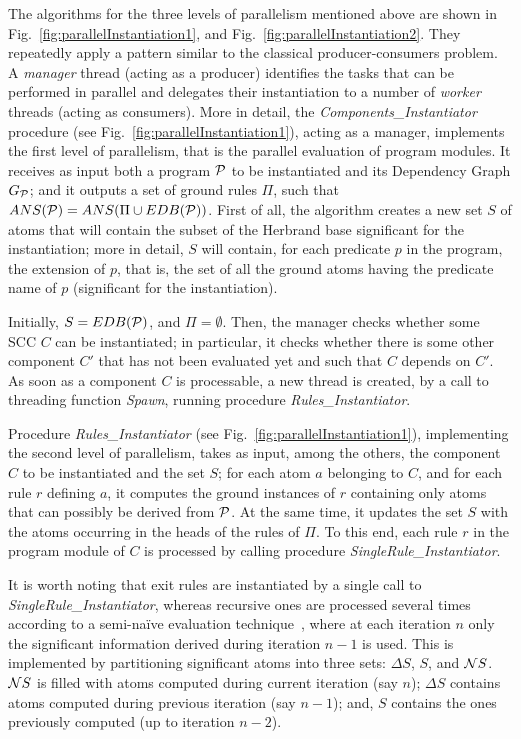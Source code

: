 \documentclass[preprint]{tlp}
\newcommand{\DNF}{\ensuremath{\Delta S}\xspace}
\newcommand{\NNF}{\ensuremath{{\cal N}S}\xspace}
\newcommand{\gpii}{\mbox{$\Pi$}}
\newcommand{\p}{\ensuremath{{\cal P}}\xspace}
\newcommand{\dgp}{\mbox{$G_{\p}$}}
\begin{document}
The algorithms for the three levels of parallelism mentioned above are
shown in Fig.~\ref{fig:parallelInstantiation1}, and Fig.~\ref{fig:parallelInstantiation2}.
They repeatedly apply a pattern similar to the classical producer-consumers problem. A
\textit{manager} thread (acting as a producer) identifies the
tasks that can be performed in parallel  and delegates their instantiation to a number
of \textit{worker} threads (acting as consumers).
More in detail, the {\em Components\_Instantiator} procedure (see Fig.~\ref{fig:parallelInstantiation1}),  acting as a manager,
implements the first level of parallelism, that is the parallel evaluation of program modules.
It receives as input both a
program $\p$ to be instantiated and its Dependency Graph $\dgp$; and it
outputs a set of ground rules $\Pi$, such that $ANS(\p)=ANS( \gpii
\cup EDB(\p))$.
First of all, the algorithm creates a new set $S$ of atoms that will
contain the subset of the Herbrand base significant for the
instantiation; more in detail, $S$ will contain, for each predicate $p$ in the program,
the extension of $p$, that is, the set of all the ground atoms having the predicate name of $p$
 (significant for the instantiation).

Initially, $S=EDB(\p)$, and $\Pi = \emptyset$. Then,
the manager checks whether some SCC $C$ can be instantiated; in particular,
it checks whether there is some other component $C'$ that has not been evaluated yet and such that $C$ depends on $C'$.
As soon as a component $C$ is processable,  a new thread is created, by a call to threading function {\em Spawn}, running procedure
{\em Rules\_Instantiator}.

Procedure {\em Rules\_Instantiator} (see Fig.~\ref{fig:parallelInstantiation1}), implementing the second level of parallelism,
takes as input, among the others, the component $C$ to be instantiated and the set $S$;
for each atom $a$ belonging to $C$, and for each rule $r$ defining
$a$, it computes the ground instances of $r$ containing only atoms
that can possibly be derived from $\p$. At the same time, it
updates the set $S$ with the atoms occurring in the heads of the
rules of $\Pi$. To this end, each rule $r$ in the program module of
$C$ is processed by calling procedure {\em
SingleRule\_Instantiator}.

It is worth noting that exit rules are instantiated by a single
call to {\em SingleRule\_Instantiator}, whereas recursive ones are
processed several times according to a semi-na\"ive evaluation
technique~\cite{ullm-89}, where at each iteration $n$ only the
significant information derived  during iteration $n-1$ is
used. This is implemented by partitioning significant atoms into
three sets: \DNF, $S$, and \NNF. \NNF is filled with atoms computed
during current iteration (say $n$); \DNF contains atoms computed
during previous iteration (say $n-1$); and, $S$ contains the ones
previously computed (up to iteration $n-2$).
\end{document}
